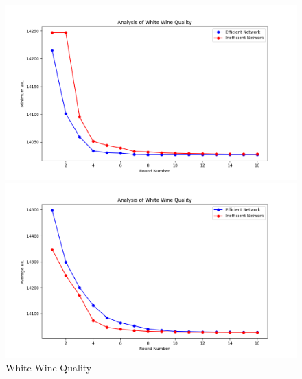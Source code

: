 \documentclass[conference]{IEEEtran}
\begin{document}
\begin{figure}[htbp]
\centerline{\includegraphics[scale=0.4]{figures/White Wine Quality Min.png}}
\centerline{\includegraphics[scale=0.4]{figures/White Wine Quality Avg.png}}
\caption{White Wine Quality}
\label{fig}
\end{figure}
\end{document}
